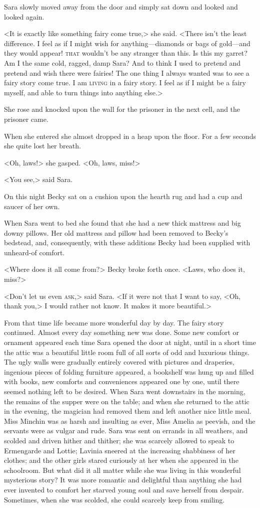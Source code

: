 Sara slowly moved away from the door and simply sat down and looked and looked again.

<It is exactly like something fairy come true,> she said. <There isn't the least difference. I feel as if I might wish for anything—diamonds or bags of gold—and they would appear! \textsc{that} wouldn't be any stranger than this. Is this my garret? Am I the same cold, ragged, damp Sara? And to think I used to pretend and pretend and wish there were fairies! The one thing I always wanted was to see a fairy story come true. I am \textsc{living} in a fairy story. I feel as if I might be a fairy myself, and able to turn things into anything else.>

She rose and knocked upon the wall for the prisoner in the next cell, and the prisoner came.

When she entered she almost dropped in a heap upon the floor. For a few seconds she quite lost her breath.

<Oh, laws!> she gasped. <Oh, laws, miss!>

<You see,> said Sara.

On this night Becky sat on a cushion upon the hearth rug and had a cup and saucer of her own.

When Sara went to bed she found that she had a new thick mattress and big downy pillows. Her old mattress and pillow had been removed to Becky's bedstead, and, consequently, with these additions Becky had been supplied with unheard-of comfort.

<Where does it all come from?> Becky broke forth once. <Laws, who does it, miss?>

<Don't let us even \textsc{ask},> said Sara. <If it were not that I want to say, <Oh, thank you,> I would rather not know. It makes it more beautiful.>

From that time life became more wonderful day by day. The fairy story continued. Almost every day something new was done. Some new comfort or ornament appeared each time Sara opened the door at night, until in a short time the attic was a beautiful little room full of all sorts of odd and luxurious things. The ugly walls were gradually entirely covered with pictures and draperies, ingenious pieces of folding furniture appeared, a bookshelf was hung up and filled with books, new comforts and conveniences appeared one by one, until there seemed nothing left to be desired. When Sara went downstairs in the morning, the remains of the supper were on the table; and when she returned to the attic in the evening, the magician had removed them and left another nice little meal. Miss Minchin was as harsh and insulting as ever, Miss Amelia as peevish, and the servants were as vulgar and rude. Sara was sent on errands in all weathers, and scolded and driven hither and thither; she was scarcely allowed to speak to Ermengarde and Lottie; Lavinia sneered at the increasing shabbiness of her clothes; and the other girls stared curiously at her when she appeared in the schoolroom. But what did it all matter while she was living in this wonderful mysterious story? It was more romantic and delightful than anything she had ever invented to comfort her starved young soul and save herself from despair. Sometimes, when she was scolded, she could scarcely keep from smiling.

